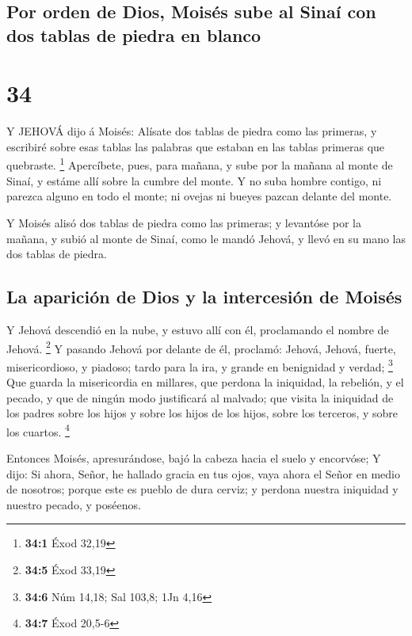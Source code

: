 \hypertarget{por-orden-de-dios-moisuxe9s-sube-al-sinauxed-con-dos-tablas-de-piedra-en-blanco}{%
\subsection{Por orden de Dios, Moisés sube al Sinaí con dos tablas de
piedra en
blanco}\label{por-orden-de-dios-moisuxe9s-sube-al-sinauxed-con-dos-tablas-de-piedra-en-blanco}}

\hypertarget{section-33}{%
\section{34}\label{section-33}}

 Y JEHOVÁ dijo á Moisés: Alísate dos tablas de piedra como
las primeras, y escribiré sobre esas tablas las palabras que estaban en
las tablas primeras que quebraste. \footnote{\textbf{34:1} Éxod 32,19}
 Apercíbete, pues, para mañana, y sube por la mañana al
monte de Sinaí, y estáme allí sobre la cumbre del monte.  Y
no suba hombre contigo, ni parezca alguno en todo el monte; ni ovejas ni
bueyes pazcan delante del monte.

 Y Moisés alisó dos tablas de piedra como las primeras; y
levantóse por la mañana, y subió al monte de Sinaí, como le mandó
Jehová, y llevó en su mano las dos tablas de piedra.

\hypertarget{la-apariciuxf3n-de-dios-y-la-intercesiuxf3n-de-moisuxe9s}{%
\subsection{La aparición de Dios y la intercesión de
Moisés}\label{la-apariciuxf3n-de-dios-y-la-intercesiuxf3n-de-moisuxe9s}}

 Y Jehová descendió en la nube, y estuvo allí con él,
proclamando el nombre de Jehová. \footnote{\textbf{34:5} Éxod 33,19}
 Y pasando Jehová por delante de él, proclamó: Jehová,
Jehová, fuerte, misericordioso, y piadoso; tardo para la ira, y grande
en benignidad y verdad; \footnote{\textbf{34:6} Núm 14,18; Sal 103,8;
  1Jn 4,16}  Que guarda la misericordia en millares, que
perdona la iniquidad, la rebelión, y el pecado, y que de ningún modo
justificará al malvado; que visita la iniquidad de los padres sobre los
hijos y sobre los hijos de los hijos, sobre los terceros, y sobre los
cuartos. \footnote{\textbf{34:7} Éxod 20,5-6}

 Entonces Moisés, apresurándose, bajó la cabeza hacia el
suelo y encorvóse;  Y dijo: Si ahora, Señor, he hallado
gracia en tus ojos, vaya ahora el Señor en medio de nosotros; porque
este es pueblo de dura cerviz; y perdona nuestra iniquidad y nuestro
pecado, y poséenos.

